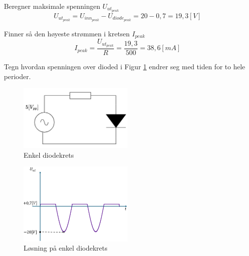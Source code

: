 \vspace{0.5cm} %

\begin{solution}[name=Løsningsforslag oppgave]
Beregner maksimale spenningen $U_{ut_{peak}}$
\[U_{ut_{peak}}=U_{inn_{peak}}-U_{diode_{peak}}=20-0,7=19,3 [V]\]

Finner så den høyeste strømmen i kretsen  $I_{peak}$
\[I_{peak}=\frac{U_{ut_{peak}}}{R}=\frac{19,3}{500}=38,6 [mA]\]

\end{solution}
\vspace{0.5cm} %






\begin{question}[name=Oppgave, topic=dioder]
Tegn hvordan spenningen over dioded i Figur \ref{fig:enklAcDiode} endrer seg med tiden for to hele perioder.
	\begin{figure}[H]
	\centering
	\includegraphics[width=0.5\textwidth]{diode/figurer/ACdiode.png}
	\caption{Enkel diodekrets}
	\label{fig:enklAcDiode}
\end{figure}
	
\end{question}

\vspace{0.5cm} %

\begin{solution}[name=Løsningsforslag oppgave]
	\begin{figure}[H]
	\centering
	\includegraphics[width=0.5\textwidth]{diode/figurer/ACdiode-LOS.png}
	\caption{Løsning på enkel diodekrets}
	\label{fig:enklAcDiodeLOS}
\end{figure}
	
\end{solution}
\vspace{0.5cm} %